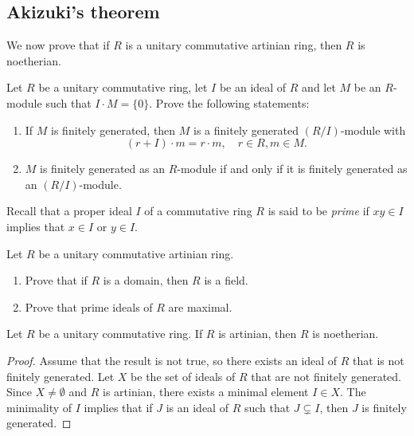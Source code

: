 \begin{graybox}
\project 
\section{Akizuki's theorem}

We now prove that 
if $R$ is a unitary commutative artinian ring, 
then $R$ is noetherian. 

\begin{xca}
  \label{xca:I_fg}
  Let $R$ be a unitary commutative ring, let $I$ be an ideal of $R$
  and let $M$ be an $R$-module such that $I\cdot M=\{0\}$. Prove the following statements:
  \begin{enumerate}
    \item If $M$ is finitely generated, then $M$ is a finitely generated
      $(R/I)$-module with
      \[
        (r+I)\cdot m=r\cdot m,\quad r\in R,m\in M.
      \]
    \item $M$ is finitely generated as an $R$-module
      if and only if it is finitely generated as an $(R/I)$-module.
  \end{enumerate}
\end{xca}

Recall that a proper ideal $I$  
of a commutative ring 
$R$ is said to be \emph{prime} if 
$xy\in I$ implies that $x\in I$ or $y\in I$. 

\begin{xca}
    Let $R$ be a unitary commutative artinian ring. 
    \begin{enumerate}
        \item Prove that if $R$ is a domain, then $R$ is a field. 
        \item Prove that prime ideals of $R$ are maximal. 
    \end{enumerate}
\end{xca}


\begin{theorem}[Akizuki]
    Let $R$ be a unitary commutative ring. If $R$ is artinian, 
    then $R$ is noetherian.
\end{theorem}

\begin{proof}
    Assume that the result is not true, so there exists an ideal of $R$ 
    that is not finitely generated. 
    Let $X$ be the set of ideals of $R$ that are not finitely generated. 
    Since $X\ne\emptyset$ and $R$ is artinian, there exists a minimal 
    element $I\in X$. The minimality of $I$ implies that 
    if $J$ is an ideal of $R$ such that $J\subsetneq I$, then 
    $J$ is finitely generated. 


\end{proof}
\end{graybox}
